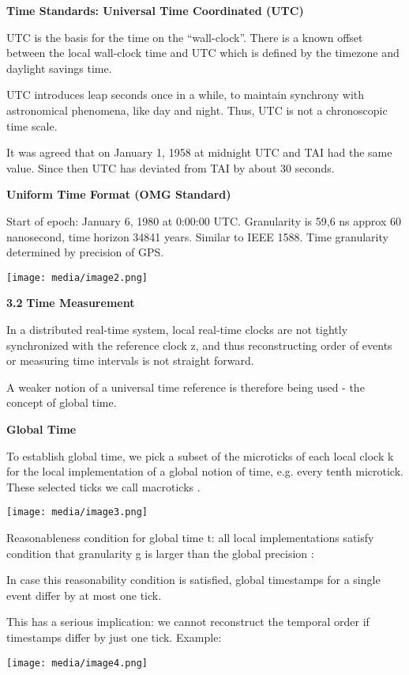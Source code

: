 \textbf{Time Standards: Universal Time Coordinated (UTC)}

UTC is the basis for the time on the ``wall-clock''. There is a known
offset between the local wall-clock time and UTC which is defined by the
timezone and daylight savings time.

UTC introduces leap seconds once in a while, to maintain synchrony with
astronomical phenomena, like day and night. Thus, UTC is not a
chronoscopic time scale.

It was agreed that on January 1, 1958 at midnight UTC and TAI had the
same value. Since then UTC has deviated from TAI by about 30 seconds.

\textbf{Uniform Time Format (OMG Standard)}

Start of epoch: January 6, 1980 at 0:00:00 UTC. Granularity is 59,6 ns
approx 60 nanosecond, time horizon 34841 years. Similar to IEEE 1588.
Time granularity determined by precision of GPS.

\texttt{[image: media/image2.png]}

\textbf{3.2} \protect\hypertarget{teil3}{}{}\textbf{Time Measurement }

In a distributed real-time system, local real-time clocks are not
tightly synchronized with the reference clock z, and thus reconstructing
order of events or measuring time intervals is not straight forward.

A weaker notion of a universal time reference is therefore being used -
the concept of global time.

\textbf{Global Time}

To establish global time, we pick a subset of the microticks of each
local clock k for the local implementation of a global notion of time,
e.g. every tenth microtick. These selected ticks we call macroticks .

\texttt{[image: media/image3.png]}

Reasonableness condition for global time t: all local implementations
satisfy condition that granularity g is larger than the global precision
:

In case this reasonability condition is satisfied, global timestamps for
a single event differ by at most one tick.

This has a serious implication: we cannot reconstruct the temporal order
if timestamps differ by just one tick. Example:

\texttt{[image: media/image4.png]}

